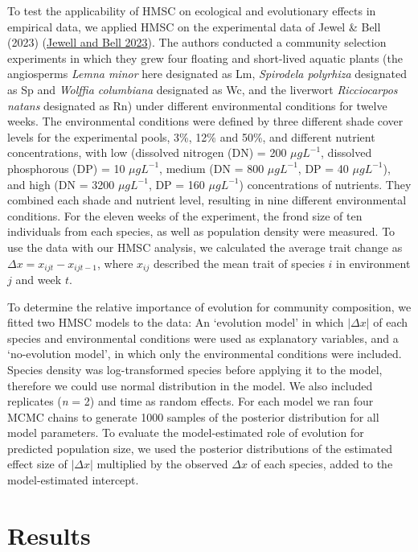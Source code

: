 \documentclass[
]{article}
\begin{document}
To test the applicability of HMSC on ecological and evolutionary effects in empirical data, we applied HMSC on the experimental data of Jewel \& Bell (2023) (\protect\hyperlink{ref-Jewell2023}{Jewell and Bell 2023}). The authors conducted a community selection experiments in which they grew four floating and short-lived aquatic plants (the angiosperms \emph{Lemna minor} here designated as Lm, \emph{Spirodela polyrhiza} designated as Sp and \emph{Wolffia columbiana} designated as Wc, and the liverwort \emph{Ricciocarpos natans} designated as Rn) under different environmental conditions for twelve weeks. The environmental conditions were defined by three different shade cover levels for the experimental pools, 3\%, 12\% and 50\%, and different nutrient concentrations, with low (dissolved nitrogen (DN) = 200 \(\mu g L^{-1}\), dissolved phosphorous (DP) = 10 \(\mu g L^{-1}\), medium (DN = 800 \(\mu g L^{-1}\), DP = 40 \(\mu g L^{-1}\)), and high (DN = 3200 \(\mu g L^{-1}\), DP = 160 \(\mu g L^{-1}\)) concentrations of nutrients. They combined each shade and nutrient level, resulting in nine different environmental conditions. For the eleven weeks of the experiment, the frond size of ten individuals from each species, as well as population density were measured. To use the data with our HMSC analysis, we calculated the average trait change as \(\Delta x = x_{ijt} - x_{ijt-1}\), where \(x_{ij}\) described the mean trait of species \(i\) in environment \(j\) and week \(t\).

To determine the relative importance of evolution for community composition, we fitted two HMSC models to the data: An `evolution model' in which \(|\Delta x|\) of each species and environmental conditions were used as explanatory variables, and a `no-evolution model', in which only the environmental conditions were included. Species density was log-transformed species before applying it to the model, therefore we could use normal distribution in the model. We also included replicates (\emph{n} = 2) and time as random effects. For each model we ran four MCMC chains to generate 1000 samples of the posterior distribution for all model parameters. To evaluate the model-estimated role of evolution for predicted population size, we used the posterior distributions of the estimated effect size of \(|\Delta x|\) multiplied by the observed \(\Delta x\) of each species, added to the model-estimated intercept.

\hypertarget{results}{%
\section{Results}\label{results}}
\end{document}
